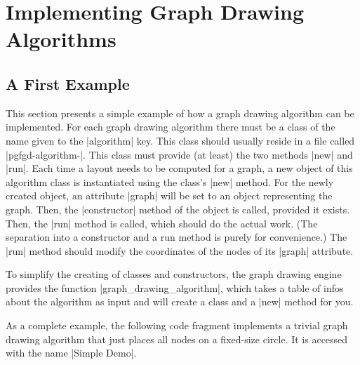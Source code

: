%
%
%


\section{Implementing Graph Drawing Algorithms}
\label{section-gd-own-algorithm}
\label{section-library-graphdrawing-ownAlgorithm}


\subsection{A First Example}

This section presents a simple example of how a graph drawing
algorithm can be implemented. For each graph drawing algorithm
there must be a class of the name given to the |algorithm| key. This
class should usually reside in a file called
|pgfgd-algorithm-|. This class must provide (at
least) the two methods |new| and |run|. Each time a layout needs to
be computed for a graph, a new object of this algorithm class is
instantiated using the class's |new| method. For the newly created
object, an attribute |graph| will be set to an object representing the
graph. Then, the |constructor| method of the object is called,
provided it exists. Then, the |run| method is called, which should do
the actual work. (The separation into a constructor and a run method
is purely for convenience.) The |run| method should modify the
coordinates of the nodes of its |graph| attribute.

To simplify the creating of classes and constructors, the graph
drawing engine provides the function |graph_drawing_algorithm|, which
takes a table of infos about the algorithm as input and will create a
class and a |new| method for you.

As a complete example, the following code fragment implements a
trivial graph drawing algorithm that just places all nodes on a
fixed-size circle.  It is accessed with the name 
|Simple Demo|.



